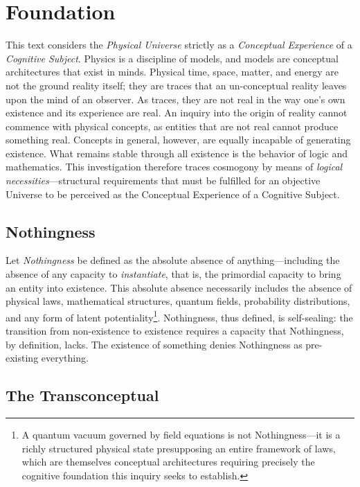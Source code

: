 \section{Foundation}

This text considers the \textit{Physical Universe} strictly as a
\textit{Conceptual Experience} of a \textit{Cognitive Subject}. Physics is a
discipline of models, and models are conceptual architectures that exist in
minds. Physical time, space, matter, and energy are not the ground reality
itself; they are traces that an un-conceptual reality leaves upon the mind of
an observer. As traces, they are not real in the way one's own existence and its
experience are real. An inquiry into the origin of reality cannot commence with physical
concepts, as entities that are not real cannot produce something real.
Concepts in general, however, are equally incapable of generating existence.
What remains stable through all existence is the behavior of logic and
mathematics. This investigation therefore traces cosmogony by means of
\textit{logical necessities}---structural requirements that must be fulfilled
for an objective Universe to be perceived as the Conceptual Experience of a
Cognitive Subject.

\subsection{Nothingness}

Let \textit{Nothingness} be defined as the absolute absence of
anything---including the absence of any capacity to \textit{instantiate}, that
is, the primordial capacity to bring an entity into existence. This absolute
absence necessarily includes the absence of physical laws, mathematical
structures, quantum fields, probability distributions, and any form of latent
potentiality\footnote{A quantum vacuum governed by field equations is not
Nothingness---it is a richly structured physical state presupposing an entire
framework of laws, which are themselves conceptual architectures requiring
precisely the cognitive foundation this inquiry seeks to establish.}.
Nothingness, thus defined, is self-sealing: the transition from non-existence
to existence requires a capacity that Nothingness, by definition, lacks.
The existence of something denies Nothingness as pre-existing everything.

\subsection{The Transconceptual}

